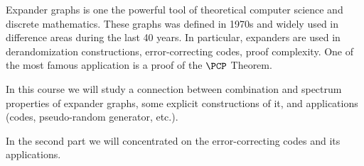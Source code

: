 Expander graphs is one the powerful tool of theoretical computer science and discrete mathematics. These
graphs was defined in 1970s and widely used in difference areas during the last 40 years. In particular,
expanders are used in derandomization constructions, error-correcting codes, proof complexity. One of the
most famous application is a proof of the $\PCP$ Theorem.

In this course we will study a connection between combination and spectrum properties of expander
graphs, some explicit constructions of it, and applications (codes, pseudo-random generator, etc.).

In the second part we will concentrated on the error-correcting codes and its applications.